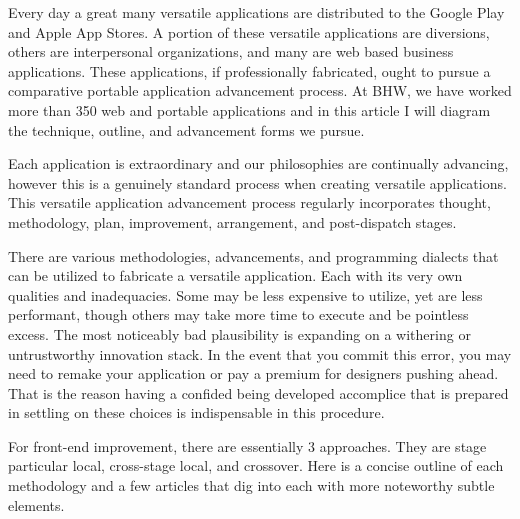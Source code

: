 Every day a great many versatile applications are distributed to the Google Play and Apple App Stores. A portion of these versatile applications are diversions, others are interpersonal organizations, and many are web based business applications. These applications, if professionally fabricated, ought to pursue a comparative portable application advancement process. At BHW, we have worked more than 350 web and portable applications and in this article I will diagram the technique, outline, and advancement forms we pursue. 

Each application is extraordinary and our philosophies are continually advancing, however this is a genuinely standard process when creating versatile applications. This versatile application advancement process regularly incorporates thought, methodology, plan, improvement, arrangement, and post-dispatch stages.

There are various methodologies, advancements, and programming dialects that can be utilized to fabricate a versatile application. Each with its very own qualities and inadequacies. Some may be less expensive to utilize, yet are less performant, though others may take more time to execute and be pointless excess. The most noticeably bad plausibility is expanding on a withering or untrustworthy innovation stack. In the event that you commit this error, you may need to remake your application or pay a premium for designers pushing ahead. That is the reason having a confided being developed accomplice that is prepared in settling on these choices is indispensable in this procedure.

For front-end improvement, there are essentially 3 approaches. They are stage particular local, cross-stage local, and crossover. Here is a concise outline of each methodology and a few articles that dig into each with more noteworthy subtle elements.

